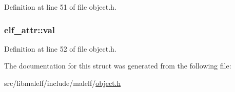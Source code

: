 Definition at line 51 of file object.h.

\hypertarget{structelf__attr_a1037d17b61bedc1b06f93b421076b053}{
\subsubsection[{val}]{ {\bf elf\_\-attr::val}}}
\label{structelf__attr_a1037d17b61bedc1b06f93b421076b053}


Definition at line 52 of file object.h.



The documentation for this struct was generated from the following file:\begin{DoxyCompactItemize}
\item 
src/libmalelf/include/malelf/\hyperlink{object_8h}{object.h}\end{DoxyCompactItemize}
